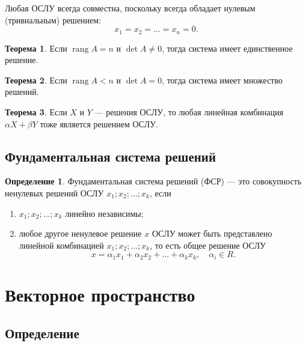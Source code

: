 \documentclass[a5paper, 11pt]{extbook}
\theoremstyle{definition}
\newtheorem{theorem}{Теорема}[section]
\theoremstyle{definition}
\newtheorem{definition}{Определение}[section]
\theoremstyle{definition}
\DeclareMathOperator{\rang}{rang}
\begin{document}
Любая ОСЛУ всегда совместна, поскольку всегда обладает нулевым (тривиальным) решением:
\begin{equation*}
    x_1 = x_2 = \ldots = x_n = 0.
\end{equation*}

\begin{theorem}
    Если \(\rang A = n\) и \(\det A \neq 0\), тогда система имеет единственное решение.
\end{theorem}

\begin{theorem}
    Если \(\rang A < n\) и \(\det A = 0\), тогда система имеет множество решений.
\end{theorem}

\begin{theorem}
    Если \(X\) и \(Y\) — решения ОСЛУ, то любая линейная комбинация \(\alpha X + \beta Y\) тоже является решением ОСЛУ.
\end{theorem}

\section{Фундаментальная система решений}

\begin{definition}
    Фундаментальная система решений (ФСР) — это совокупность ненулевых решений ОСЛУ \(x_1; x_2; \ldots; x_k\), если
    \begin{enumerate}
        \item \(x_1; x_2; \ldots; x_k\) линейно независимы;
        \item любое другое ненулевое решение \(x\) ОСЛУ может быть представлено линейной комбинацией \(x_1; x_2; \ldots; x_k\), то есть общее решение ОСЛУ
              \begin{equation*}
                  x = \alpha_1 x_1 + \alpha_2 x_2 + \ldots + \alpha_k x_k,
                  \quad
                  \alpha_i \in R.
              \end{equation*}
    \end{enumerate}
\end{definition}

\chapter{Векторное пространство}

\section{Определение}
\end{document}

